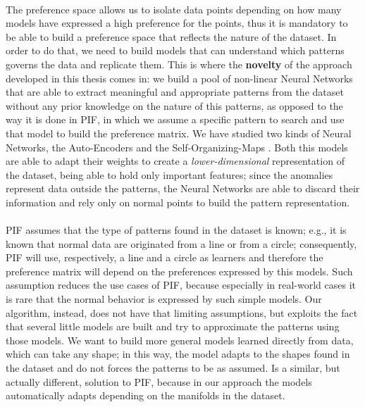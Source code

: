 \paragraph{}
The preference space allows us to isolate data points depending on how many models have expressed a high preference for the points, thus it is mandatory to be able to build a preference space that reflects the nature of the dataset. In order to do that, we need to build models that can understand which patterns governs the data and replicate them. \newline
This is where the \textbf{novelty} of the approach developed in this thesis comes in: we build a pool of non-linear Neural Networks that are able to extract meaningful and appropriate patterns from the dataset without any prior knowledge on the nature of this patterns, as opposed to the way it is done in PIF, in which we assume a specific pattern to search and use that model to build the preference matrix. We have studied two kinds of Neural Networks, the Auto-Encoders \cite{ae_paper} and the Self-Organizing-Maps \cite{som_paper}. Both this models are able to adapt their weights to create a \textit{lower-dimensional} representation of the dataset, being able to hold only important features; since the anomalies represent data outside the patterns, the Neural Networks are able to discard their information and rely only on normal points to build the pattern representation.

\paragraph{}
PIF assumes that the type of patterns found in the dataset is known; e.g., it is known that normal data are originated from a line or from a circle; consequently, PIF will use, respectively, a line and a circle as learners and therefore the preference matrix will depend on the preferences expressed by this models. \newline
Such assumption reduces the use cases of PIF, because especially in real-world cases it is rare that the normal behavior is expressed by such simple models. \newline
Our algorithm, instead, does not have that limiting assumptions, but exploits the fact that several little models are built and try to approximate the patterns using those models. We want to build more general models learned directly from data, which can take any shape; in this way, the model adapts to the shapes found in the dataset and do not forces the patterns to be as assumed. Is a similar, but actually different, solution to PIF, because in our approach the models automatically adapts depending on the manifolds in the dataset.

